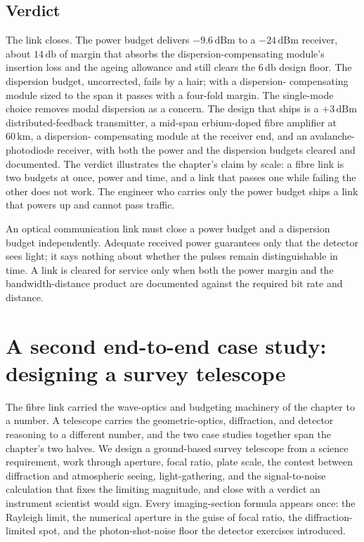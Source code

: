 \subsection{Verdict}

The link closes. The power budget delivers $-9.6\,\text{dBm}$ to a
$-24\,\text{dBm}$ receiver, about $14\,\si{\decibel}$ of margin that absorbs the
dispersion-compensating module's insertion loss and the ageing allowance and
still clears the $6\,\si{\decibel}$ design floor. The
dispersion budget, uncorrected, fails by a hair; with a dispersion-
compensating module sized to the span it passes with a four-fold margin. The
single-mode choice removes modal dispersion as a concern. The design that
ships is a $+3\,\text{dBm}$ distributed-feedback transmitter, a mid-span
erbium-doped fibre amplifier at $60\,\si{\kilo\meter}$, a dispersion-
compensating module at the receiver end, and an avalanche-photodiode
receiver, with both the power and the dispersion budgets cleared and
documented. The verdict illustrates the chapter's claim by scale: a fibre
link is two budgets at once, power and time, and a link that passes one while
failing the other does not work. The engineer who carries only the power
budget ships a link that powers up and cannot pass traffic.

\begin{principle}
An optical communication link must close a power budget and a dispersion
budget independently. Adequate received power guarantees only that the
detector sees light; it says nothing about whether the pulses remain
distinguishable in time. A link is cleared for service only when both the
power margin and the bandwidth-distance product are documented against the
required bit rate and distance.
\end{principle}

\section{A second end-to-end case study: designing a survey telescope}

The fibre link carried the wave-optics and budgeting machinery of the chapter
to a number. A telescope carries the geometric-optics, diffraction, and
detector reasoning to a different number, and the two case studies together
span the chapter's two halves. We design a ground-based survey telescope from a
science requirement, work through aperture, focal ratio, plate scale, the
contest between diffraction and atmospheric seeing, light-gathering, and the
signal-to-noise calculation that fixes the limiting magnitude, and close with a
verdict an instrument scientist would sign. Every imaging-section formula
appears once: the Rayleigh limit, the numerical aperture in the guise of focal
ratio, the diffraction-limited spot, and the photon-shot-noise floor the
detector exercises introduced.

